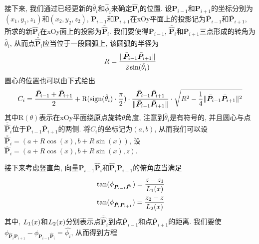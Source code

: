 \documentclass[utf8]{ctexart} %
\begin{document}
	 接下来, 我们通过已经更新的$\hat{\theta}_i$和$\hat{\phi}_i$来确定$\hat{\boldsymbol{P}}_i$的位置. 设$\boldsymbol{P}_{i-1}$和$\boldsymbol{P}_{i+1}$的坐标分别为$(x_1,y_1,z_1)$和$(x_2,y_2,z_2)$, $\boldsymbol{P}_{i-1}$和$\boldsymbol{P}_{i+1}$在xOy平面上的投影记为$\bar{\boldsymbol{P}}_{i-1}$和$\bar{\boldsymbol{P}}_{i+1}$, 所求的新$\hat{\boldsymbol{P}}_i$在xOy面上的投影为$\bar{\hat{\boldsymbol{P}}}_i$. 我们要使得$\bar{\boldsymbol{P}}_{i-1}$, $\bar{\hat{\boldsymbol{P}}}_i$和$\bar{\boldsymbol{P}}_{i+1}$三点形成的转角为$\hat{\theta}_i$, 从而点$\bar{\hat{\boldsymbol{P}}}_i$应当位于一段圆弧上, 该圆弧的半径为
	 \begin{equation}
	 R = \frac{\Arrowvert\bar{\boldsymbol{P}}_{i-1}\bar{\boldsymbol{P}}_{i+1}\Arrowvert}{2\sin(\hat{\theta}_i)}
	 \end{equation}
	 圆心的位置也可以由下式给出
	 \begin{equation}
	 C_i = \frac{\bar{\boldsymbol{P}}_{i-1}+\bar{\boldsymbol{P}}_{i+1}}2+\mathrm{R}(\mathrm{sign}(\hat{\theta}_i)\cdot\frac{\pi}2)\cdot\frac{\bar{\boldsymbol{P}}_{i-1}\bar{\boldsymbol{P}}_{i+1}}{\Arrowvert\bar{\boldsymbol{P}}_{i-1}\bar{\boldsymbol{P}}_{i+1}\Arrowvert}\cdot\sqrt{R^2-\frac14\Arrowvert\bar{\boldsymbol{P}}_{i-1}\bar{\boldsymbol{P}}_{i+1}\Arrowvert^2}
	 \end{equation}
	 其中$\mathrm{R}(\theta)$表示在xOy平面绕原点旋转$\theta$角度, 注意到$\hat{\theta}_i$是有符号的, 并且圆心与点$\bar{\hat{\boldsymbol{P}}}_i$位于$\bar{\boldsymbol{P}}_{i-1}\bar{\boldsymbol{P}}_{i+1}$的两侧. 将$C_i$的坐标记为$(a,b)$, 从而我们可以设$\bar{\hat{\boldsymbol{P}}}_i=(a+R\cos(x),b+R\sin(x))$, 设$\hat{\boldsymbol{P}}_i=(a+R\cos(x),b+R\sin(x),z)$. \par 
	 接下来考虑竖直角, 向量$\boldsymbol{P}_{i-1}\hat{\boldsymbol{P}}_i$和$\hat{\boldsymbol{P}}_i\boldsymbol{P}_{i+1}$的俯角应当满足
	 \begin{equation}
	 \begin{aligned}
	 &\tan(\phi_{\boldsymbol{P}_{i-1}\hat{\boldsymbol{P}}_i}) = \frac{z-z_1}{\boldmath{L}_1(x)}\\
	 &\tan(\phi_{\hat{\boldsymbol{P}}_i\boldsymbol{P}_{i+1}}) = \frac{z_2-z}{\boldmath{L}_2(x)}
	 \end{aligned}
	 \end{equation}
	 其中, $\boldmath{L}_1(x)$和$\boldmath{L}_2(x)$分别表示点$\bar{\hat{\boldsymbol{P}}}_i$到点$\bar{\boldsymbol{P}}_{i-1}$和点$\bar{\boldsymbol{P}}_{i+1}$的距离. 我们要使$\phi_{\hat{\boldsymbol{P}}_i\boldsymbol{P}_{i+1}}-\phi_{\boldsymbol{P}_{i-1}\hat{\boldsymbol{P}}_i}=\hat{\phi_i}$, 从而得到方程
\end{document}
